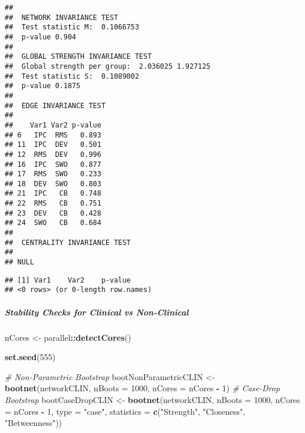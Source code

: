 \documentclass[
]{article}
\newenvironment{Shaded}{\begin{snugshade}}{\end{snugshade}}
\newcommand{\CommentTok}[1]{\textcolor[rgb]{0.56,0.35,0.01}{\textit{#1}}}
\newcommand{\DataTypeTok}[1]{\textcolor[rgb]{0.13,0.29,0.53}{#1}}
\newcommand{\DecValTok}[1]{\textcolor[rgb]{0.00,0.00,0.81}{#1}}
\newcommand{\FloatTok}[1]{\textcolor[rgb]{0.00,0.00,0.81}{#1}}
\newcommand{\KeywordTok}[1]{\textcolor[rgb]{0.13,0.29,0.53}{\textbf{#1}}}
\newcommand{\NormalTok}[1]{#1}
\newcommand{\OperatorTok}[1]{\textcolor[rgb]{0.81,0.36,0.00}{\textbf{#1}}}
\newcommand{\StringTok}[1]{\textcolor[rgb]{0.31,0.60,0.02}{#1}}
\begin{document}
\begin{verbatim}
## 
##  NETWORK INVARIANCE TEST 
##  Test statistic M:  0.1066753 
##  p-value 0.904 
## 
##  GLOBAL STRENGTH INVARIANCE TEST 
##  Global strength per group:  2.036025 1.927125 
##  Test statistic S:  0.1089002 
##  p-value 0.1875 
## 
##  EDGE INVARIANCE TEST 
## 
##    Var1 Var2 p-value
## 6   IPC  RMS   0.893
## 11  IPC  DEV   0.501
## 12  RMS  DEV   0.996
## 16  IPC  SWO   0.877
## 17  RMS  SWO   0.233
## 18  DEV  SWO   0.803
## 21  IPC   CB   0.748
## 22  RMS   CB   0.751
## 23  DEV   CB   0.428
## 24  SWO   CB   0.684
## 
##  CENTRALITY INVARIANCE TEST 
##  
## NULL
\end{verbatim}

\begin{Shaded}
\end{Shaded}

\begin{verbatim}
## [1] Var1    Var2    p-value
## <0 rows> (or 0-length row.names)
\end{verbatim}

\hypertarget{stability-checks-for-clinical-vs-non-clinical-1}{%
\subparagraph{Stability Checks for Clinical vs
Non-Clinical}\label{stability-checks-for-clinical-vs-non-clinical-1}}

\begin{Shaded}
\begin{Highlighting}[]
\NormalTok{nCores <-}\StringTok{ }\NormalTok{parallel}\OperatorTok{::}\KeywordTok{detectCores}\NormalTok{()}

\KeywordTok{set.seed}\NormalTok{(}\DecValTok{555}\NormalTok{)}

\CommentTok{# Non-Parametric Bootstrap}
\NormalTok{bootNonParametricCLIN <-}\StringTok{ }\KeywordTok{bootnet}\NormalTok{(networkCLIN,}
                             \DataTypeTok{nBoots =} \DecValTok{1000}\NormalTok{,}
                             \DataTypeTok{nCores =}\NormalTok{ nCores }\OperatorTok{-}\StringTok{ }\DecValTok{1}\NormalTok{)}
\CommentTok{# Case-Drop Bootstrap}
\NormalTok{bootCaseDropCLIN <-}\StringTok{ }\KeywordTok{bootnet}\NormalTok{(networkCLIN,}
                        \DataTypeTok{nBoots =} \DecValTok{1000}\NormalTok{,}
                        \DataTypeTok{nCores =}\NormalTok{ nCores }\OperatorTok{-}\StringTok{ }\DecValTok{1}\NormalTok{,}
                        \DataTypeTok{type =} \StringTok{"case"}\NormalTok{,}
                        \DataTypeTok{statistics =} \KeywordTok{c}\NormalTok{(}\StringTok{"Strength"}\NormalTok{, }\StringTok{"Closeness"}\NormalTok{, }\StringTok{"Betweenness"}\NormalTok{))}
\end{Highlighting}
\end{Shaded}
\end{document}
